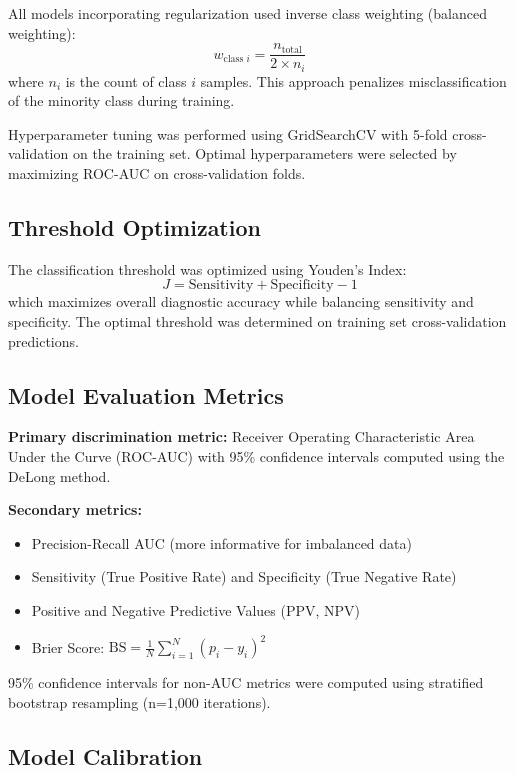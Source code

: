 \documentclass[11pt,a4paper]{article}
\begin{document}
All models incorporating regularization used inverse class weighting (balanced weighting): 
\begin{equation}
w_{\text{class } i} = \frac{n_{\text{total}}}{2 \times n_i}
\end{equation}
where $n_i$ is the count of class $i$ samples. This approach penalizes misclassification of the minority class during training.

Hyperparameter tuning was performed using GridSearchCV with 5-fold cross-validation on the training set. Optimal hyperparameters were selected by maximizing ROC-AUC on cross-validation folds.

\subsection{Threshold Optimization}

The classification threshold was optimized using Youden's Index:
\begin{equation}
J = \text{Sensitivity} + \text{Specificity} - 1
\end{equation}
which maximizes overall diagnostic accuracy while balancing sensitivity and specificity. The optimal threshold was determined on training set cross-validation predictions.

\subsection{Model Evaluation Metrics}

\textbf{Primary discrimination metric:} Receiver Operating Characteristic Area Under the Curve (ROC-AUC) with 95\% confidence intervals computed using the DeLong method.\cite{DeLong1988}

\textbf{Secondary metrics:}
\begin{itemize}
    \item Precision-Recall AUC (more informative for imbalanced data)
    \item Sensitivity (True Positive Rate) and Specificity (True Negative Rate)
    \item Positive and Negative Predictive Values (PPV, NPV)
    \item Brier Score: $\text{BS} = \frac{1}{N} \sum_{i=1}^{N} (p_i - y_i)^2$
\end{itemize}

95\% confidence intervals for non-AUC metrics were computed using stratified bootstrap resampling (n=1,000 iterations).

\subsection{Model Calibration}
\end{document}
